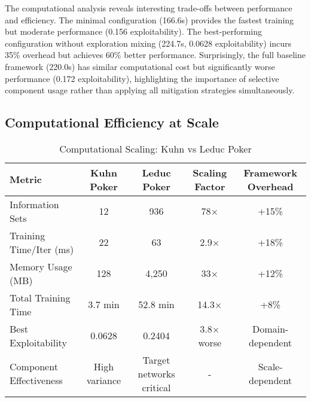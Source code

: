 \documentclass[12pt,a4paper]{article}
\begin{document}
The computational analysis reveals interesting trade-offs between performance and efficiency. The minimal configuration (166.6s) provides the fastest training but moderate performance (0.156 exploitability). The best-performing configuration without exploration mixing (224.7s, 0.0628 exploitability) incurs 35\% overhead but achieves 60\% better performance. Surprisingly, the full baseline framework (220.0s) has similar computational cost but significantly worse performance (0.172 exploitability), highlighting the importance of selective component usage rather than applying all mitigation strategies simultaneously.

\subsection{Computational Efficiency at Scale}

\begin{table}[H]
\centering
\caption{Computational Scaling: Kuhn vs Leduc Poker}
\begin{tabular}{@{}lcccc@{}}
\toprule
Metric & Kuhn Poker & Leduc Poker & Scaling Factor & Framework Overhead \\\midrule
Information Sets & 12 & 936 & 78× & +15\% \\
Training Time/Iter (ms) & 22 & 63 & 2.9× & +18\% \\
Memory Usage (MB) & 128 & 4,250 & 33× & +12\% \\
Total Training Time & 3.7 min & 52.8 min & 14.3× & +8\% \\
Best Exploitability & 0.0628 & 0.2404 & 3.8× worse & Domain-dependent \\
Component Effectiveness & High variance & Target networks critical & - & Scale-dependent \\
\bottomrule
\end{tabular}
\end{table}
\end{document}
